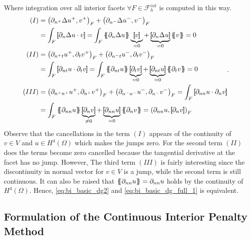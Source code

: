 Where integration over all interior facets $ \forall F \in \mathcal{F}_{h}^{int}$ is computed in this way.
\begin{equation*}
    \begin{split}
        (I) &  =    \left(\partial _{n^{+}} \Delta  u^{+} ,v^{+}\right)_{F} +
        \left(\partial _{n^{-}} \Delta  u^{-} ,v^{-}\right)_{F}  \\
        & =   \int_{F}^{}
        \jump{ \partial _{n} \Delta  u \cdot v } =
         \int_{F}^{}
         \mean{ \partial _{n} \Delta  u } \underbrace{\jump{ v }}_{= 0}    + \underbrace{\jump{ \partial _{n} \Delta  u
         }}_{= 0}    \mean{ v } = 0 \\
        (II) &  =     \left(\partial _{n^{+}t} u^{+}, \partial_{t} v^{+}
        \right)_{F} +  \left(\partial _{n^{-}t} u^{-}, \partial_{t} v^{-}
\right)_{F}   \\
&  =   \int_{F}^{}
        \jump{ \partial _{nt} u \cdot  \partial_{t} v } =
         \int_{F}^{}
         \mean{ \partial _{nt} u    } \underbrace{\jump{ \partial_{t} v }  }_{= 0}    + \underbrace{\jump{ \partial
                 _{nt}  u
         }}_{= 0}    \mean{ \partial _{t}v }  = 0\\
        (III) &  =     \left(\partial _{n^{+}n^{+}} u^{+}, \partial_{n^{+}} v^{+} \right)_{F} +  \left(\partial _{n^{-}n^{-}} u^{-}, \partial_{n^{-}} v^{-} \right)_{F}    =    \int_{F}^{} \jump{ \partial _{nn} u \cdot  \partial_{n} v }  \\
        & = \int_{F}^{}
        \mean{ \partial _{nn} u    } \underbrace{\jump{ \partial_{n} v }  }_{\neq 0}    + \underbrace{\jump{ \partial
                 _{nn}  u
         }}_{= 0}    \mean{ \partial _{n}v }   =  \left( \partial _{nn} u, \jump{ \partial_{n} v } \right)_{F}   \end{split}
.\end{equation*}
Observe that the cancellations in the term $(I)$ appears of the continuity of $v\in V $ and $u\in H^{4}( \Omega ) $ which makes the jumps zero. For the second term $(II)$ does the terms become zero cancelled because the tangential
derivative at the facet has no jump. However, The third term $(III)$  is fairly interesting since the discontinuity in
normal vector for $v \in V$ is a jump, while the second term is still continuous. It can also be raised that $\left\{\!\!\left\{
\partial _{nn} u \right\}\!\!\right\} = \partial _{nn} u  $ holds by the continuity of $H^{4}( \Omega  ) $. Hence,
\eqref{eq:bi_basic_dg2} and \eqref{eq:bi_basic_dg_full_1} is equivalent.

\subsection{Formulation of the Continuous Interior Penalty Method}%
\label{sub:formulation_of_continious_interior_penalty_method}

